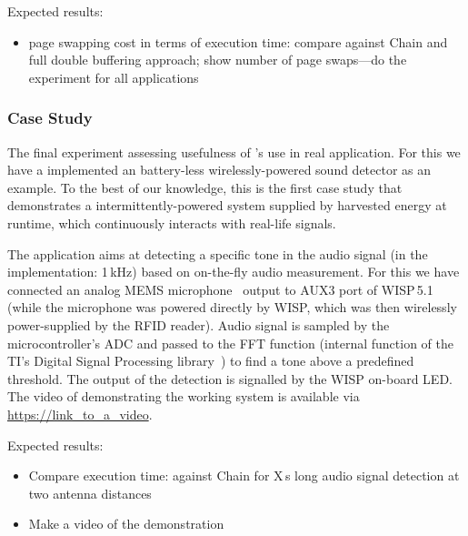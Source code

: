Expected results:
\begin{itemize}
	\item page swapping cost in terms of execution time: compare against Chain and full double buffering approach; show number of page swaps---do the experiment for all applications
\end{itemize} 


\subsubsection{Case Study}
\label{sec:case_study}

The final experiment assessing usefulness of \sys's use in real application. For this we have a implemented an battery-less wirelessly-powered sound detector as an example. To the best of our knowledge, this is the first case study that demonstrates a intermittently-powered system supplied by harvested energy at runtime, which continuously interacts with real-life signals. 

The application aims at detecting a specific tone in the audio signal (in the implementation: 1\,kHz) based on on-the-fly audio measurement. For this we have connected an analog MEMS microphone~\cite{microphone} output to AUX3 port of WISP\,5.1 (while the microphone was powered directly by WISP, which was then wirelessly power-supplied by the RFID reader). Audio signal is sampled by the microcontroller's ADC and passed to the FFT function (internal function of the TI's Digital Signal Processing library~\cite{ti_dsp}) to find a tone above a predefined threshold. The output of the detection is signalled by the WISP on-board LED. The video of demonstrating the working system is available via \url{https://link_to_a_video}.

Expected results:
\begin{itemize}
	\item Compare execution time: \sys against Chain for X\,s long audio signal detection at two antenna distances
	\item Make a video of the demonstration 
\end{itemize}
 
